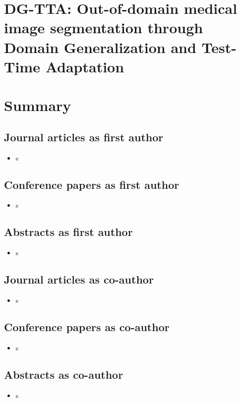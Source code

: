 \documentclass[
	11pt,
	a4paper,
	twoside,
	headsepline,
	titlepage,
	DIV=11,
	BCOR=12mm,
	captions=tableheading,
	chapterprefix=on,
	numbers=noenddot,
]{scrbook}
\begin{document}
    \chapter[DG-TTA]{DG-TTA: Out-of-domain medical image segmentation through Domain Generalization and Test-Time Adaptation}
        
    \chapter{Summary}
    \printbibliography[heading=bibintoc]


    \section*{Journal articles as first author}
        \begin{itemize}
            \item s
        \end{itemize}

    \section*{Conference papers as first author}
        \begin{itemize}
            \item s
        \end{itemize}

    \section*{Abstracts as first author}
        \begin{itemize}
            \item s
        \end{itemize}

    \section*{Journal articles as co-author}
        \begin{itemize}
            \item s
        \end{itemize}

    \section*{Conference papers as co-author}
        \begin{itemize}
            \item s
        \end{itemize}

    \section*{Abstracts as co-author}
        \begin{itemize}
            \item s
        \end{itemize}
\end{document}
